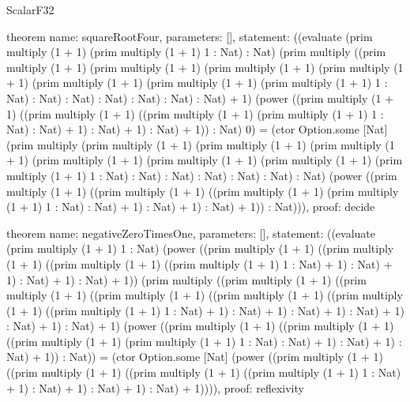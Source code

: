 \begin{lexlean}{ScalarF32}
\begin{semanticmodule}
theorem{
  name: squareRootFour,
  parameters: [],
  statement: ((evaluate (prim multiply (1 + 1) (prim multiply (1 + 1) 1 : Nat) : Nat) (prim multiply ((prim multiply (1 + 1) (prim multiply (1 + 1) (prim multiply (1 + 1) (prim multiply (1 + 1) (prim multiply (1 + 1) (prim multiply (1 + 1) (prim multiply (1 + 1) 1 : Nat) : Nat) : Nat) : Nat) : Nat) : Nat) : Nat) + 1) (power ((prim multiply (1 + 1) ((prim multiply (1 + 1) ((prim multiply (1 + 1) (prim multiply (1 + 1) 1 : Nat) : Nat) + 1) : Nat) + 1) : Nat) + 1)) : Nat) 0) = (ctor Option.some [Nat] (prim multiply (prim multiply (1 + 1) (prim multiply (1 + 1) (prim multiply (1 + 1) (prim multiply (1 + 1) (prim multiply (1 + 1) (prim multiply (1 + 1) (prim multiply (1 + 1) 1 : Nat) : Nat) : Nat) : Nat) : Nat) : Nat) : Nat) (power ((prim multiply (1 + 1) ((prim multiply (1 + 1) ((prim multiply (1 + 1) (prim multiply (1 + 1) 1 : Nat) : Nat) + 1) : Nat) + 1) : Nat) + 1)) : Nat))),
  proof: decide{}
}

theorem{
  name: negativeZeroTimesOne,
  parameters: [],
  statement: ((evaluate (prim multiply (1 + 1) 1 : Nat) (power ((prim multiply (1 + 1) ((prim multiply (1 + 1) ((prim multiply (1 + 1) ((prim multiply (1 + 1) 1 : Nat) + 1) : Nat) + 1) : Nat) + 1) : Nat) + 1)) (prim multiply ((prim multiply (1 + 1) ((prim multiply (1 + 1) ((prim multiply (1 + 1) ((prim multiply (1 + 1) ((prim multiply (1 + 1) ((prim multiply (1 + 1) 1 : Nat) + 1) : Nat) + 1) : Nat) + 1) : Nat) + 1) : Nat) + 1) : Nat) + 1) (power ((prim multiply (1 + 1) ((prim multiply (1 + 1) ((prim multiply (1 + 1) (prim multiply (1 + 1) 1 : Nat) : Nat) + 1) : Nat) + 1) : Nat) + 1)) : Nat)) = (ctor Option.some [Nat] (power ((prim multiply (1 + 1) ((prim multiply (1 + 1) ((prim multiply (1 + 1) ((prim multiply (1 + 1) 1 : Nat) + 1) : Nat) + 1) : Nat) + 1) : Nat) + 1)))),
  proof: reflexivity{}
}
\end{semanticmodule}
\end{lexlean}
